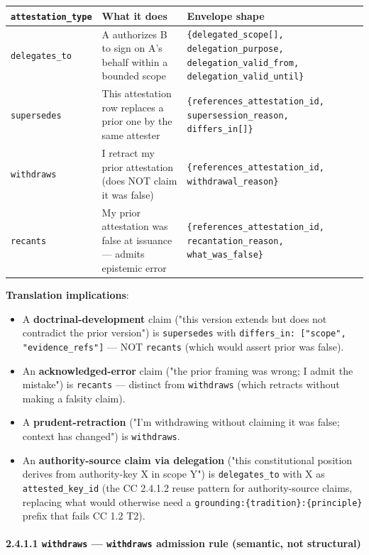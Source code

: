 \documentclass[11pt]{article}
\begin{document}
{\footnotesize
\begin{longtable}{|p{5.33cm}|p{5.33cm}|p{5.33cm}|}\hline
\textbf{\texttt{attestation\_type}} & \textbf{What it does} & \textbf{Envelope shape} \\ \hline\endhead
\texttt{delegates\_to} & A authorizes B to sign on A's behalf within a bounded scope & \texttt{\{delegated\_scope[], delegation\_purpose, delegation\_valid\_from, delegation\_valid\_until\}} \\ \hline
\texttt{supersedes} & This attestation row replaces a prior one by the same attester & \texttt{\{references\_attestation\_id, supersession\_reason, differs\_in[]\}} \\ \hline
\texttt{withdraws} & I retract my prior attestation (does NOT claim it was false) & \texttt{\{references\_attestation\_id, withdrawal\_reason\}} \\ \hline
\texttt{recants} & My prior attestation was false at issuance — admits epistemic error & \texttt{\{references\_attestation\_id, recantation\_reason, what\_was\_false\}} \\ \hline
\end{longtable}}


\textbf{Translation implications}:


\begin{itemize}\setlength\itemsep{0pt}
\item A \textbf{doctrinal-development} claim ("this version extends but does not contradict the prior version") is \texttt{supersedes} with \texttt{differs\_in: ["scope", "evidence\_refs"]} — NOT \texttt{recants} (which would assert prior was false).
\item An \textbf{acknowledged-error} claim ("the prior framing was wrong; I admit the mistake") is \texttt{recants} — distinct from \texttt{withdraws} (which retracts without making a falsity claim).
\item A \textbf{prudent-retraction} ("I'm withdrawing without claiming it was false; context has changed") is \texttt{withdraws}.
\item An \textbf{authority-source claim via delegation} ("this constitutional position derives from authority-key X in scope Y") is \texttt{delegates\_to} with X as \texttt{attested\_key\_id} (the CC 2.4.1.2 reuse pattern for authority-source claims, replacing what would otherwise need a \texttt{grounding:\{tradition\}:\{principle\}} prefix that fails CC 1.2 T2).
\end{itemize}


\paragraph{2.4.1.1 \texttt{withdraws} — \texttt{withdraws} admission rule (semantic, not structural)}\mbox{}\\
\end{document}
